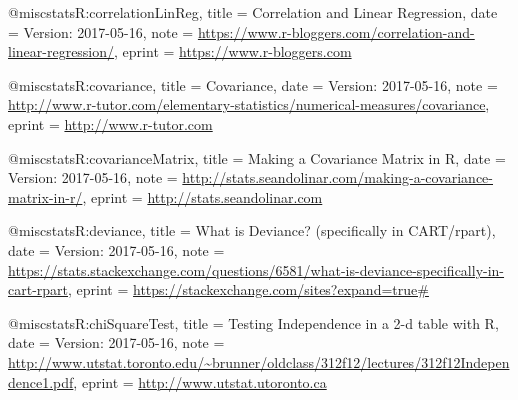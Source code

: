 @misc{statsR:correlationLinReg,
title = {{Correlation and Linear Regression}},
date = {Version: 2017-05-16},
note = {\url{https://www.r-bloggers.com/correlation-and-linear-regression/}},
eprint = {\url{https://www.r-bloggers.com}}}

@misc{statsR:covariance,
title = {{Covariance}},
date = {Version: 2017-05-16},
note = {\url{http://www.r-tutor.com/elementary-statistics/numerical-measures/covariance}},
eprint = {\url{http://www.r-tutor.com}}}

@misc{statsR:covarianceMatrix,
title = {{Making a Covariance Matrix in R}},
date = {Version: 2017-05-16},
note = {\url{http://stats.seandolinar.com/making-a-covariance-matrix-in-r/}},
eprint = {\url{http://stats.seandolinar.com}}}

@misc{statsR:deviance,
title = {{What is Deviance? (specifically in CART/rpart)}},
date = {Version: 2017-05-16},
note = {\url{https://stats.stackexchange.com/questions/6581/what-is-deviance-specifically-in-cart-rpart}},
eprint = {\url{https://stackexchange.com/sites?expand=true#}}}

@misc{statsR:chiSquareTest,
title = {{Testing Independence in a 2-d table with R}},
date = {Version: 2017-05-16},
note = {\url{http://www.utstat.toronto.edu/~brunner/oldclass/312f12/lectures/312f12Independence1.pdf}},
eprint = {\url{http://www.utstat.utoronto.ca}}}
